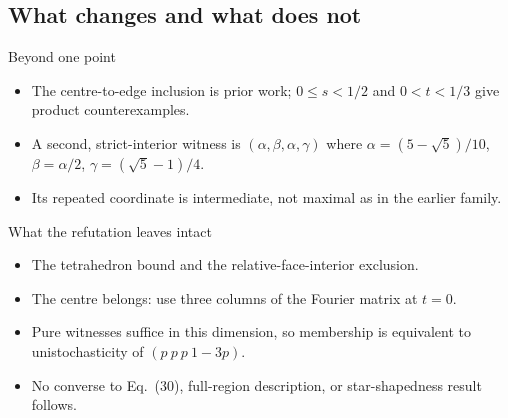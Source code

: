 \documentclass{beamer}
\begin{document}
\subsection{What changes and what does not}
\begin{frame}{Beyond one point}
  \begin{itemize}
    \item The centre-to-edge inclusion is prior work; $0\le s<1/2$ and $0<t<1/3$ give product counterexamples.
    \item A second, strict-interior witness is $(\alpha,\beta,\alpha,\gamma)$ where $\alpha=(5-\sqrt5)/10$, $\beta=\alpha/2$, $\gamma=(\sqrt5-1)/4$.
    \item Its repeated coordinate is intermediate, not maximal as in the earlier family.
  \end{itemize}
\end{frame}
\begin{frame}{What the refutation leaves intact}
  \begin{itemize}
    \item The tetrahedron bound and the relative-face-interior exclusion.
    \item The centre belongs: use three columns of the Fourier matrix at $t=0$.
    \item Pure witnesses suffice in this dimension, so membership is equivalent to unistochasticity of $(p\ p\ p\ 1-3p)$.
    \item No converse to Eq.~(30), full-region description, or star-shapedness result follows.
  \end{itemize}
\end{frame}
\end{document}
